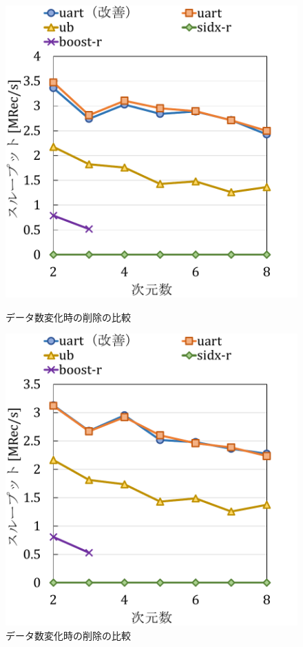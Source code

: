 \begin{figure}[tb]
  \begin{minipage}[c]{0.495\textwidth}
    \centering
    \includegraphics[scale=0.5]{./figures/graph-dimention-delete-0.pdf}
    \caption{データ数変化時の削除の比較}
    \label{graph:grouped}
  \end{minipage}
  \begin{minipage}[c]{0.495\textwidth}
    \centering
    \includegraphics[scale=0.5]{./figures/graph-dimention-delete-0.5.pdf}
    \caption{データ数変化時の削除の比較}
    \label{graph:paired}
  \end{minipage}
\end{figure}

